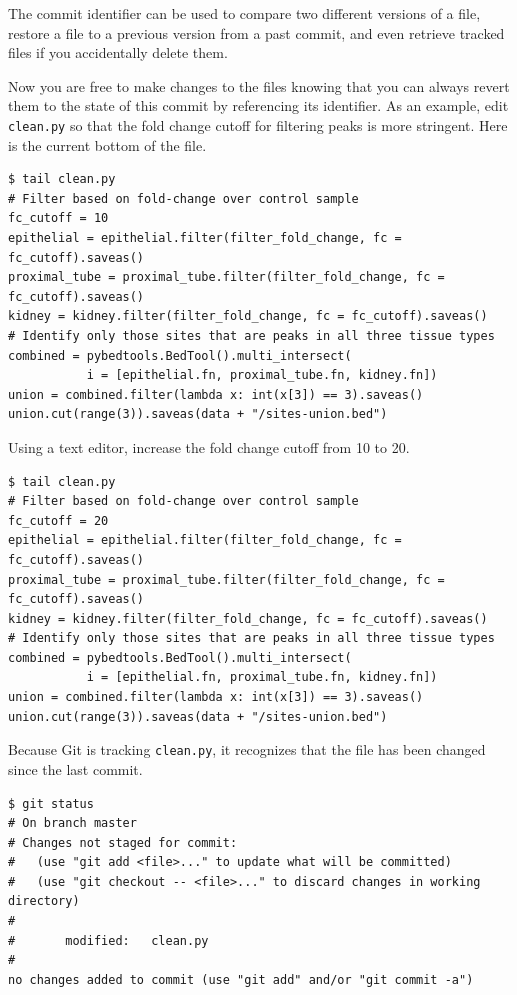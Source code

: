 \documentclass[10pt]{article}
\begin{document}
The commit identifier can be used to compare two different versions of a file, restore a file to a previous version from a past commit, and even retrieve tracked files if you accidentally delete them.

Now you are free to make changes to the files knowing that you can always revert them to the state of this commit by referencing its identifier.
As an example, edit \verb|clean.py| so that the fold change cutoff for filtering peaks is more stringent.
Here is the current bottom of the file.

\begin{verbatim}
$ tail clean.py
# Filter based on fold-change over control sample
fc_cutoff = 10
epithelial = epithelial.filter(filter_fold_change, fc = fc_cutoff).saveas()
proximal_tube = proximal_tube.filter(filter_fold_change, fc = fc_cutoff).saveas()
kidney = kidney.filter(filter_fold_change, fc = fc_cutoff).saveas()
# Identify only those sites that are peaks in all three tissue types
combined = pybedtools.BedTool().multi_intersect(
           i = [epithelial.fn, proximal_tube.fn, kidney.fn])
union = combined.filter(lambda x: int(x[3]) == 3).saveas()
union.cut(range(3)).saveas(data + "/sites-union.bed")
\end{verbatim}

Using a text editor, increase the fold change cutoff from 10 to 20.

\begin{verbatim}
$ tail clean.py
# Filter based on fold-change over control sample
fc_cutoff = 20
epithelial = epithelial.filter(filter_fold_change, fc = fc_cutoff).saveas()
proximal_tube = proximal_tube.filter(filter_fold_change, fc = fc_cutoff).saveas()
kidney = kidney.filter(filter_fold_change, fc = fc_cutoff).saveas()
# Identify only those sites that are peaks in all three tissue types
combined = pybedtools.BedTool().multi_intersect(
           i = [epithelial.fn, proximal_tube.fn, kidney.fn])
union = combined.filter(lambda x: int(x[3]) == 3).saveas()
union.cut(range(3)).saveas(data + "/sites-union.bed")
\end{verbatim}

Because Git is tracking \verb|clean.py|, it recognizes that the file has been changed since the last commit.

\begin{verbatim}
$ git status
# On branch master
# Changes not staged for commit:
#   (use "git add <file>..." to update what will be committed)
#   (use "git checkout -- <file>..." to discard changes in working directory)
#
#       modified:   clean.py
#
no changes added to commit (use "git add" and/or "git commit -a")
\end{verbatim}
\end{document}
